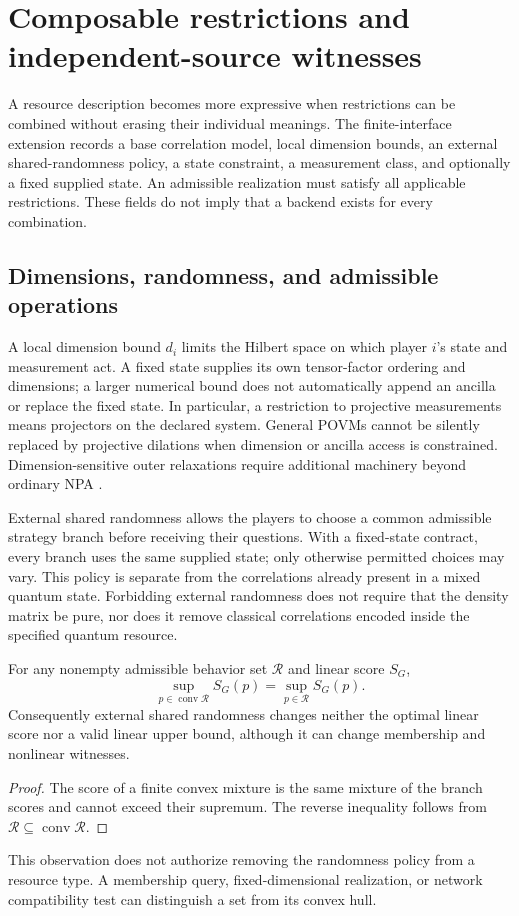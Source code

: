 \section{Composable restrictions and independent-source witnesses}
\label{sec:resourceextensions}

A resource description becomes more expressive when restrictions can be
combined without erasing their individual meanings. The finite-interface
extension records a base correlation model, local dimension bounds, an
external shared-randomness policy, a state constraint, a measurement class,
and optionally a fixed supplied state. An admissible realization must satisfy
all applicable restrictions. These fields do not imply that a backend exists
for every combination.

\subsection{Dimensions, randomness, and admissible operations}
A local dimension bound $d_i$ limits the Hilbert space on which player $i$'s
state and measurement act. A fixed state supplies its own tensor-factor
ordering and dimensions; a larger numerical bound does not automatically
append an ancilla or replace the fixed state. In particular, a restriction to
projective measurements means projectors on the declared system. General
POVMs cannot be silently replaced by projective dilations when dimension or
ancilla access is constrained. Dimension-sensitive outer relaxations require
additional machinery beyond ordinary NPA \cite{navascues2015}.

External shared randomness allows the players to choose a common admissible
strategy branch before receiving their questions. With a fixed-state
contract, every branch uses the same supplied state; only otherwise permitted
choices may vary. This policy is separate from the correlations already
present in a mixed quantum state. Forbidding external randomness does not
require that the density matrix be pure, nor does it remove classical
correlations encoded inside the specified quantum resource.

\begin{proposition}
\label{prop:convexification}
For any nonempty admissible behavior set $\mathcal R$ and linear score $S_G$,
\[
 \sup_{p\in\operatorname{conv}\mathcal R}S_G(p)
 =\sup_{p\in\mathcal R}S_G(p).
\]
Consequently external shared randomness changes neither the optimal linear
score nor a valid linear upper bound, although it can change membership and
nonlinear witnesses.
\end{proposition}
\begin{proof}
The score of a finite convex mixture is the same mixture of the branch
scores and cannot exceed their supremum. The reverse inequality follows from
$\mathcal R\subseteq\operatorname{conv}\mathcal R$.
\end{proof}
This observation does not authorize removing the randomness policy from a
resource type. A membership query, fixed-dimensional realization, or network
compatibility test can distinguish a set from its convex hull.

